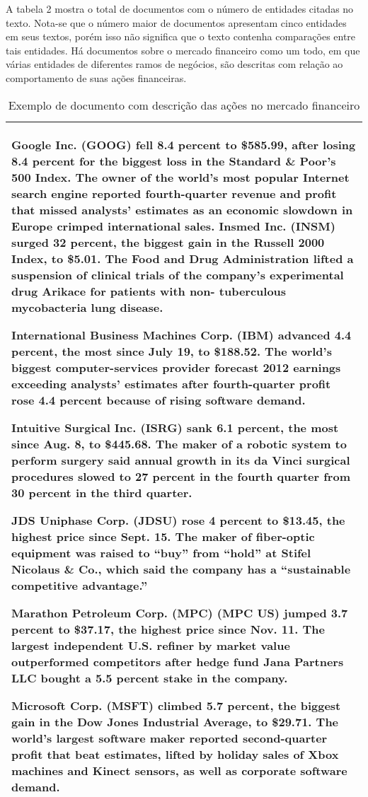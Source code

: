 \documentclass[a4paper,12pt]{article}
\begin{document}
A tabela 2 mostra o total de documentos com o número de entidades citadas no texto. Nota-se que o número maior de documentos apresentam cinco entidades em seus textos, porém isso não significa que o texto contenha comparações entre tais entidades. Há documentos sobre o mercado financeiro como um todo, em que várias entidades de diferentes ramos de negócios, são descritas com relação ao comportamento de suas ações financeiras.

\begin{table}[h!]
\begin{tabular}{|l|}
\hline
\begin{minipage}[t]{1.0\columnwidth}

Google Inc. (GOOG) fell 8.4 percent to \$585.99, after losing 8.4 percent for the biggest loss in the Standard \& Poor’s 500 Index. The owner of the world’s most popular Internet search engine reported fourth-quarter revenue and profit that missed analysts’ estimates as an economic slowdown in Europe crimped international sales.
Insmed Inc. (INSM) surged 32 percent, the biggest gain in the Russell 2000 Index, to \$5.01. The Food and Drug Administration lifted a suspension of clinical trials of the company’s experimental drug Arikace for patients with non- tuberculous mycobacteria lung disease.

International Business Machines Corp. (IBM) advanced 4.4 percent, the most since July 19, to \$188.52. The world’s biggest computer-services provider forecast 2012 earnings exceeding analysts’ estimates after fourth-quarter profit rose 4.4 percent because of rising software demand.

Intuitive Surgical Inc. (ISRG) sank 6.1 percent, the most since Aug. 8, to \$445.68. The maker of a robotic system to perform surgery said annual growth in its da Vinci surgical procedures slowed to 27 percent in the fourth quarter from 30 percent in the third quarter.

JDS Uniphase Corp. (JDSU) rose 4 percent to \$13.45, the highest price since Sept. 15. The maker of fiber-optic equipment was raised to “buy” from “hold” at Stifel Nicolaus \& Co., which said the company has a “sustainable competitive advantage.”

Marathon Petroleum Corp. (MPC) (MPC US) jumped 3.7 percent to \$37.17, the highest price since Nov. 11. The largest independent U.S. refiner by market value outperformed competitors after hedge fund Jana Partners LLC bought a 5.5 percent stake in the company.

Microsoft Corp. (MSFT) climbed 5.7 percent, the biggest gain in the Dow Jones Industrial Average, to \$29.71. The world’s largest software maker reported second-quarter profit that beat estimates, lifted by holiday sales of Xbox machines and Kinect sensors, as well as corporate software demand.

\end{minipage}\tabularnewline
\hline
\end{tabular}
\caption{Exemplo de documento com descrição das ações no mercado financeiro}
\end{table}
\end{document}
